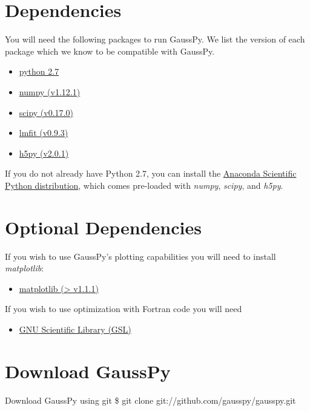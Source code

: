 \documentclass[letterpaper,10pt,openany,oneside]{sphinxmanual}
\begin{document}
\section{Dependencies}
\label{install:dependencies}
You will need the following packages to run GaussPy. We list the version of each
package which we know to be compatible with GaussPy.
\begin{itemize}
\item {} 
\href{http://www.numpy.org/}{python 2.7}

\item {} 
\href{http://www.numpy.org/}{numpy (v1.12.1)}

\item {} 
\href{http://www.scipy.org/}{scipy (v0.17.0)}

\item {} 
\href{https://lmfit.github.io/lmfit-py/intro.html}{lmfit (v0.9.3)}

\item {} 
\href{http://www.h5py.org/}{h5py (v2.0.1)}

\end{itemize}

If you do not already have Python 2.7, you can install the \href{https://store.continuum.io/cshop/anaconda/}{Anaconda Scientific
Python distribution}, which comes
pre-loaded with \emph{numpy}, \emph{scipy}, and \emph{h5py}.


\section{Optional Dependencies}
\label{install:optional-dependencies}
If you wish to use GaussPy's plotting capabilities you will need to install
\emph{matplotlib}:
\begin{itemize}
\item {} 
\href{http://matplotlib.org/}{matplotlib (\textgreater{} v1.1.1)}

\end{itemize}

If you wish to use optimization with Fortran code you will need
\begin{itemize}
\item {} 
\href{http://www.gnu.org/software/gsl/}{GNU Scientific Library (GSL)}

\end{itemize}


\section{Download GaussPy}
\label{install:download-gausspy}
Download GaussPy using git \$ git clone git://github.com/gausspy/gausspy.git
\end{document}
